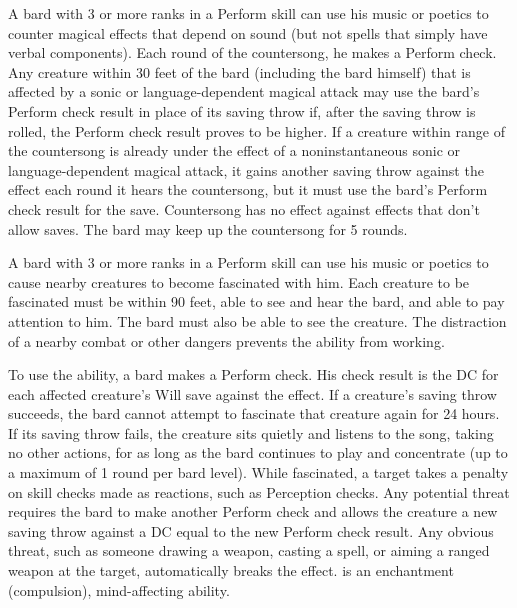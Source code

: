  A bard with 3 or more ranks in a Perform skill can use his music or poetics to counter magical effects that depend on sound (but not spells that simply have verbal components). Each round of the countersong, he makes a Perform check. Any creature within 30 feet of the bard (including the bard himself) that is affected by a sonic or language-dependent magical attack may use the bard's Perform check result in place of its saving throw if, after the saving throw is rolled, the Perform check result proves to be higher. If a creature within range of the countersong is already under the effect of a noninstantaneous sonic or language-dependent magical attack, it gains another saving throw against the effect each round it hears the countersong, but it must use the bard's Perform check result for the save. Countersong has no effect against effects that don't allow saves. The bard may keep up the countersong for 5 rounds.

 A bard with 3 or more ranks in a Perform skill can
use his music or poetics to cause   nearby creatures  to become
fascinated with him. Each creature to be fascinated must be within
90 feet, able to see and hear the bard, and able to pay attention to
him. The bard must also be able to see the creature. The distraction
of a nearby combat or other dangers prevents the ability from
working.

\par To use the ability, a bard makes a Perform check. His check result
is the DC for each affected creature's Will save against the effect. If a
creature's saving throw succeeds, the bard cannot attempt to
fascinate that creature again for 24 hours. If its saving throw fails,
the creature sits quietly and listens to the song, taking no other
actions, for as long as the bard continues to play and concentrate (up
to a maximum of 1 round per bard level). While fascinated, a target
takes a  penalty on skill checks made as reactions, such as Perception checks. Any potential threat requires the bard to make
another Perform check and allows the creature a new saving throw
against a DC equal to the new Perform check result. Any obvious
threat, such as someone drawing a weapon, casting a spell, or aiming
a ranged weapon at the target, automatically breaks the effect.  is an enchantment (compulsion), mind-affecting ability.

